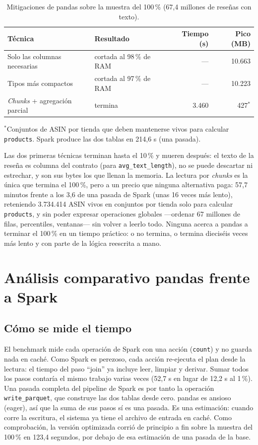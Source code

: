 \documentclass[11pt,a4paper]{article}
\begin{document}
\begin{table}[H]
\centering
\caption{Mitigaciones de pandas sobre la muestra del 100\,\% (67,4 millones de reseñas con
texto).}
\label{tab:mitigaciones}
\begin{tabular}{llrr}
\toprule
Técnica & Resultado & Tiempo (s) & Pico (MB) \\
\midrule
Solo las columnas necesarias & cortada al 98\,\% de RAM & --- & 10.663 \\
Tipos más compactos & cortada al 97\,\% de RAM & --- & 10.223 \\
\textit{Chunks} + agregación parcial & termina & 3.460 & 427$^{\ast}$ \\
\bottomrule
\end{tabular}
\smallskip

\footnotesize{$^{\ast}$Conjuntos de ASIN por tienda que deben mantenerse vivos para calcular
\texttt{products}. Spark produce las dos tablas en 214,6 s (una pasada).}
\end{table}

Las dos primeras técnicas terminan hasta el 10\,\% y mueren después: el texto de la reseña es
columna del contrato (para \texttt{avg\_text\_length}), no se puede descartar ni estrechar, y
son sus bytes los que llenan la memoria. La lectura por \textit{chunks} es la única que
termina el 100\,\%, pero a un precio que ninguna alternativa paga: 57,7 minutos frente a los
3,6 de una pasada de Spark (unas 16 veces más lento), reteniendo 3.734.414 ASIN vivos en
conjuntos por tienda solo para calcular \texttt{products}, y sin poder expresar operaciones
globales —ordenar 67 millones de filas, percentiles, ventanas— sin volver a leerlo todo.
Ninguna acerca a pandas a terminar el 100\,\% en un tiempo práctico: o no termina, o termina
dieciséis veces más lento y con parte de la lógica reescrita a mano.

\section{Análisis comparativo pandas frente a Spark}
\label{sec:comparativo}

\subsection{Cómo se mide el tiempo}

El benchmark mide cada operación de Spark con una acción (\texttt{count}) y no guarda nada en
caché. Como Spark es perezoso, cada acción re-ejecuta el plan desde la lectura: el tiempo del
paso ``join'' ya incluye leer, limpiar y derivar. Sumar todos los pasos contaría el mismo
trabajo varias veces (52,7 s en lugar de 12,2 s al 1\,\%). Una pasada completa del pipeline de
Spark es por tanto la operación \texttt{write\_parquet}, que construye las dos tablas desde
cero. pandas es ansioso (eager), así que la suma de sus pasos sí es una pasada. Es una
estimación: cuando corre la escritura, el sistema ya tiene el archivo de entrada en caché.
Como comprobación, la versión optimizada corrió de principio a fin sobre la muestra del
100\,\% en 123,4 segundos, por debajo de esa estimación de una pasada de la base.
\end{document}
